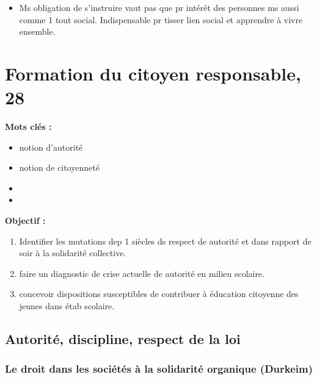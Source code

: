 \documentclass[12pt]{report}
\begin{document}
\begin{itemize}
\item Ms obligation de s'instruire vaut pas que pr intérêt des personnes ms aussi comme 1 tout social.  Indispensable pr tisser lien social et apprendre à vivre ensemble.

\end{itemize}

\chapter{Formation du citoyen responsable, 28}


\textbf{Mots clés : } \\
\begin{itemize}
\item notion d'autorité
\item notion de citoyenneté
\item 
\item 
\end{itemize}

\vspace{0.5cm}

\textbf{Objectif :} \\
\begin{enumerate}
\item Identifier les mutations dep 1 siècles ds respect de autorité et dans rapport de soir à la solidarité collective.
\item faire un diagnostic de crise actuelle de autorité en milieu scolaire.
\item concevoir dispositions susceptibles de contribuer à éducation citoyenne des jeunes dans étab scolaire. \\
\end{enumerate}


\section{Autorité, discipline, respect de la loi}

\subsection{Le droit dans les sociétés à la solidarité organique (Durkeim)}
\end{document}

